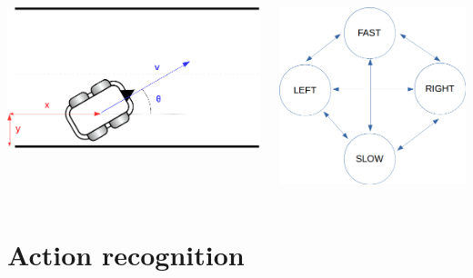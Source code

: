 \documentclass{beamer}
\begin{document}
\begin{frame}
\begin{columns}[c]
\begin{column}{0.5\textwidth}
\centering
\includegraphics[width=.6\linewidth]{coordinates}
\end{column}
\begin{column}{0.5\textwidth}
\flushleft
\includegraphics[width=.4\linewidth]{Automaton}
\end{column}
\end{columns}

\end{frame}

\section{Action recognition}
\end{document}
